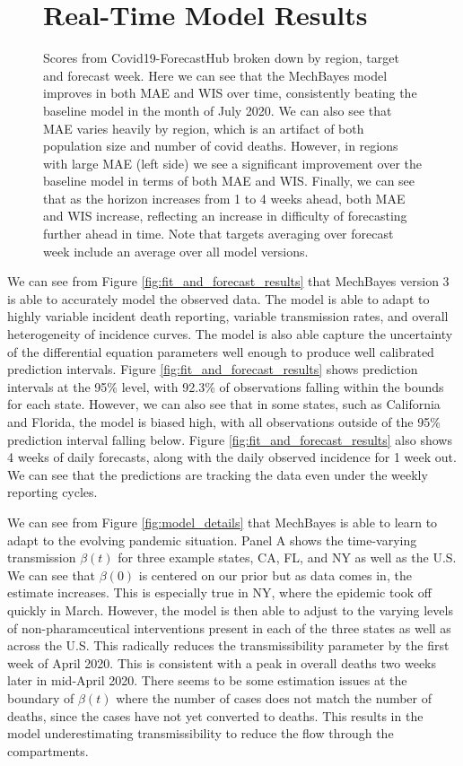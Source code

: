 \documentclass[11pt]{amsart}
\begin{document}
\begin{figure}
\section{Real-Time Model Results}

\caption{Scores from Covid19-ForecastHub broken down by region, target and forecast week. Here we can see that the MechBayes model improves in both MAE and WIS over time, consistently beating the baseline model in the month of July 2020. We can also see that MAE varies heavily by region, which is an artifact of both population size and number of covid deaths. However, in regions with large MAE (left side) we see a significant improvement over the baseline model in terms of both MAE and WIS. Finally, we can see that as the horizon increases from 1 to 4 weeks ahead, both MAE and WIS increase, reflecting an increase in difficulty of forecasting further ahead in time. Note that targets averaging over forecast week include an average over all model versions. }
\label{fig:covidhub}
\end{figure}


We can see from Figure \ref{fig:fit_and_forecast_results} that MechBayes version 3 is able to accurately model the observed data. The model is able to adapt to highly variable incident death reporting, variable transmission rates, and overall heterogeneity of incidence curves. The model is also able capture the uncertainty of the differential equation parameters well enough to produce well calibrated prediction intervals. Figure \ref{fig:fit_and_forecast_results}  shows prediction intervals at the 95\% level, with 92.3\% of observations falling within the bounds for each state. However, we can also see that in some states, such as California and Florida, the model is biased high, with all observations outside of the 95\% prediction interval falling below. Figure \ref{fig:fit_and_forecast_results}  also shows 4 weeks of daily forecasts, along with the daily observed incidence for 1 week out. We can see that the predictions are tracking the data even under the weekly reporting cycles. 

We can see from Figure \ref{fig:model_details} that MechBayes is able to learn to adapt to the evolving pandemic situation. Panel A shows the time-varying transmission $\beta(t)$ for three example states, CA, FL, and NY as well as the U.S. We can see that $\beta(0)$ is centered on our prior but as data comes in, the estimate increases. This is especially true in NY, where the epidemic took off quickly in March. However, the model is then able to adjust to the varying levels of non-pharamceutical interventions present in each of the three states as well as across the U.S. This radically reduces the transmissibility parameter by the first week of April 2020. This is consistent with a peak in overall deaths two weeks later in mid-April 2020. There seems to be some estimation issues at the boundary of $\beta(t)$ where the number of cases does not match the number of deaths, since the cases have not yet converted to deaths. This results in the model underestimating transmissibility to reduce the flow through the compartments. 
\end{document}
